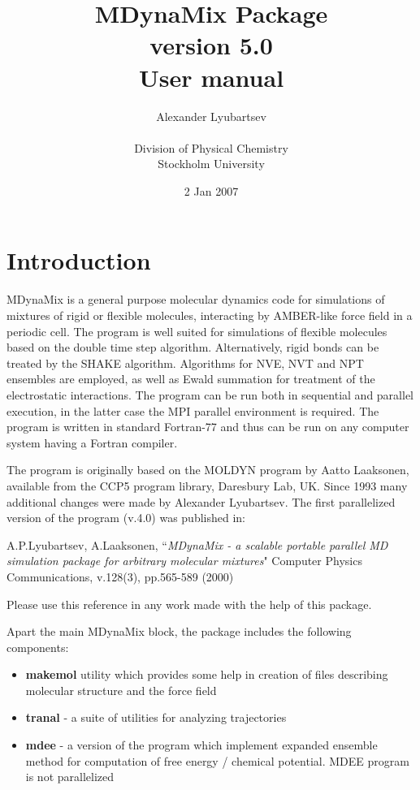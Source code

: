 \documentclass{article}
\begin{document}
\title{MDynaMix Package\\
version 5.0 \\
User manual}

\author{Alexander Lyubartsev\\ \\
Division of Physical Chemistry\\
Stockholm University
}


\date{2 Jan 2007}

\maketitle


\newpage
\tableofcontents

\newpage
\section{Introduction}

MDynaMix is a general purpose molecular dynamics code for simulations
of mixtures  of rigid or flexible molecules, interacting by
AMBER-like force field in a periodic cell. The program is well suited for
simulations of flexible molecules based on the double time step algorithm.
Alternatively, rigid bonds can be treated by the SHAKE algorithm.
Algorithms for NVE, NVT and NPT ensembles are employed, as well
as Ewald summation for treatment of the electrostatic interactions. 
The program can be run both in sequential and parallel execution, in
the latter case the MPI parallel environment is required. The program is
written in standard Fortran-77 and thus can be run on any computer 
system having a Fortran compiler.
                    
The program is originally based on the MOLDYN program by Aatto Laaksonen,
available from the CCP5 program library, Daresbury Lab, UK. Since 1993 
many additional changes were made by Alexander Lyubartsev. The first
parallelized version of the program (v.4.0) was published in:

A.P.Lyubartsev, A.Laaksonen, ``{\it MDynaMix - a scalable portable parallel MD 
simulation package for arbitrary molecular mixtures}" 
Computer Physics Communications, v.128(3), pp.565-589 (2000)

Please use this reference in any work made with the help of this package.

Apart the main MDynaMix block, the package includes the following
components:

\begin{itemize}
\item
{\bf makemol} utility which provides some help in creation of
files describing molecular structure and the force field
\item
{\bf tranal} - a suite of utilities for analyzing trajectories
\item
{\bf mdee} - a version of the program which implement expanded ensemble
method for computation of free energy / chemical potential.
MDEE program is not parallelized
\end{itemize}
\end{document}
